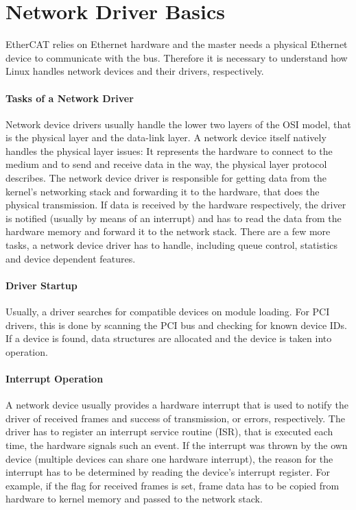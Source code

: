 \documentclass[a4paper,12pt,BCOR=6mm,bibtotoc,idxtotoc]{scrbook}
\begin{document}

\section{Network Driver Basics}
\label{sec:networkdrivers}

EtherCAT relies on Ethernet hardware and the master needs a physical
Ethernet device to communicate with the bus. Therefore it is necessary
to understand how Linux handles network devices and their drivers,
respectively.

\paragraph{Tasks of a Network Driver} Network device drivers usually handle
the lower two layers of the OSI model, that is the physical layer and the
data-link layer. A network device itself natively handles the physical layer
issues: It represents the hardware to connect to the medium and to send and
receive data in the way, the physical layer protocol describes. The network
device driver is responsible for getting data from the kernel's networking
stack and forwarding it to the hardware, that does the physical transmission.
If data is received by the hardware respectively, the driver is notified
(usually by means of an interrupt) and has to read the data from the hardware
memory and forward it to the network stack. There are a few more tasks, a
network device driver has to handle, including queue control, statistics and
device dependent features.

\paragraph{Driver Startup} Usually, a driver searches for compatible devices
on module loading.  For PCI drivers, this is done by scanning the PCI bus and
checking for known device IDs. If a device is found, data structures are
allocated and the device is taken into operation.

\paragraph{Interrupt Operation} A network device usually
provides a hardware interrupt that is used to notify the driver of received
frames and success of transmission, or errors, respectively. The driver has to
register an interrupt service routine
(ISR), that is
executed each time, the hardware signals such an event. If the interrupt was
thrown by the own device (multiple devices can share one hardware interrupt),
the reason for the interrupt has to be determined by reading the device's
interrupt register. For example, if the flag for received frames is set, frame
data has to be copied from hardware to kernel memory and passed to the network
stack.
\end{document}
